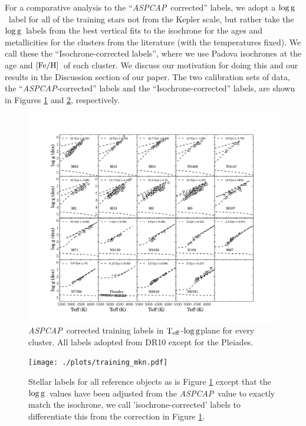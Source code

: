 \documentclass[12pt, preprint]{aastex}
\newcommand{\teff}{\mbox{$\rm T_{eff}$}}
\newcommand{\feh}{\mbox{$\rm [Fe/H]$}}
\newcommand{\logg}{\mbox{$\rm \log g$}}
\newcommand{\aspcap}{\textsl{ASPCAP}}
\begin{document}
For a comparative analysis to the ``\aspcap\ corrected'' labels, we adopt a \logg\ label for all of the training stars not from the Kepler scale, but rather take the \logg\ labels from the best vertical fits to the isochrone for the ages and metallicities for the clusters from the literature (with the temperatures fixed). We call these the ``Isochrone-corrected labels'', where we use Padova isochrones at the age and \feh\ of each cluster. We discuss our motivation for doing this and our results in the Discussion section of our paper.  The two calibration sets of data, the ``\aspcap-corrected'' labels and the ``Isochrone-corrected'' labels, are shown in Figures \ref{fig:trainingaspcap} and \ref{fig:trainingisochrone}, respectively. 

\begin{figure}[h!]
\centering
    \includegraphics[scale=0.33]{./plots/training_aspcap.pdf}
\caption{\aspcap\ corrected training labels in \teff-\logg plane for every cluster. All labels adopted from DR10 except for the Pleiades. }
\label{fig:trainingaspcap}
\end{figure}

\begin{figure}[h!]
\centering
  \texttt{[image: ./plots/training\_mkn.pdf]}
\caption{Stellar labels for all reference objects as is Figure \ref{fig:trainingaspcap} except that the \logg\ values have been adjusted from the \aspcap\ value to exactly match the isochrone, we call  'isochrone-corrected' labels to differentiate this from the correction in Figure \ref{fig:trainingaspcap}.  }
\label{fig:trainingisochrone}
\end{figure}
\end{document}
